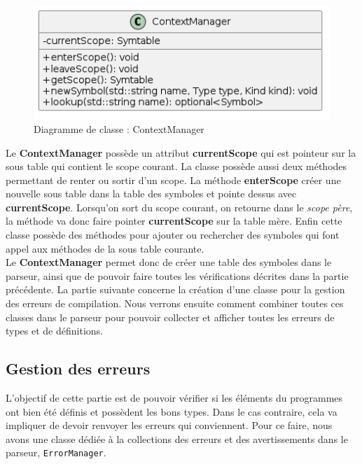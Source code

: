 \documentclass[a4paper]{article}%
\begin{document}
\begin{figure}[h!]
  \begin{center}
  \includegraphics[scale=0.5]{../ressources/diagrams/contextManager.png}
  \caption{Diagramme de classe : ContextManager}
  \end{center}
\end{figure}

Le \textbf{ContextManager} possède un attribut \textbf{currentScope} qui est pointeur sur
la sous table qui contient le scope courant. La classe possède aussi deux
méthodes permettant de renter ou sortir d'un scope. La méthode
\textbf{enterScope} créer une nouvelle sous table dans la table des symboles et
pointe dessus avec \textbf{currentScope}. Lorsqu'on sort du scope courant, on
retourne dans le \textit{scope père}, la méthode va donc faire pointer
\textbf{currentScope} sur la table mère. Enfin cette classe possède des méthodes
pour ajouter ou rechercher des symboles qui font appel aux méthodes de la sous
table courante.\\

Le \textbf{ContextManager} permet donc de créer une table des symboles dans le
parseur, ainsi que de pouvoir faire toutes les vérifications décrites dans la
partie précédente. La partie suivante concerne la création d'une classe pour la
gestion des erreurs de compilation. Nous verrons ensuite comment combiner toutes
ces classes dans le parseur pour pouvoir collecter et afficher toutes les
erreurs de types et de définitions.

\subsection{Gestion des erreurs}

L'objectif de cette partie est de pouvoir vérifier si les éléments du programmes
ont bien été définis et possèdent les bons types. Dans le cas contraire, cela va
impliquer de devoir renvoyer les erreurs qui conviennent. Pour ce faire, nous
avons une classe dédiée à la collections des erreurs et des avertissements dans
le parseur, \lstinline{ErrorManager}.
\end{document}
